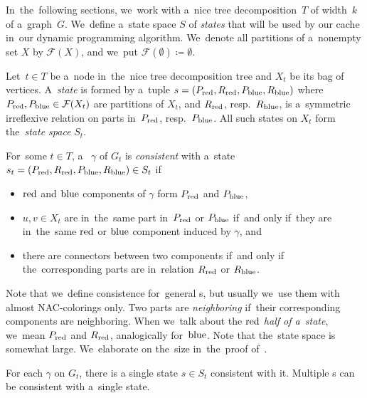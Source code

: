 In~the~following sections,
we~work with a~nice tree decomposition~\( T \) of width~\( k \)
of a~graph~\( G \).
%
We~define a~state space \( S \) of \emph{states}
that will be used by our cache in~our dynamic programming algorithm.
We~denote all partitions of a~nonempty set \( X \) by \( \mathcal{F}(X) \),
and we~put \( \mathcal{F}(\emptyset) \coloneq \emptyset \).

%
\begin{definition}
	Let~\( t \in T \) be a~node in~the~nice tree decomposition tree and
	\( X_t \) be its bag of vertices.
	A~\emph{state} is formed by a~tuple \( s = (P_{\text{red}}, R_{\text{red}}, P_{\text{blue}}, R_{\text{blue}}) \)
	where \( P_{\text{red}}, P_{\text{blue}} \in \mathcal{F}(X_t)\) are partitions of \( X_t \),
	and \( R_{\text{red}}\), resp.\ \(R_{\text{blue}} \), is a~symmetric irreflexive relation
	on parts in~\( P_{\text{red}}\), resp.\ \(P_{\text{blue}} \).
	All such states on \( X_t \) form the~\emph{state space} \( S_t \).
\end{definition}
%
For~some \( t \in T \), a~\rbcol{} \( \gamma \) of \( G_t \)
is \emph{consistent} with a~state \( s_t = (P_{\text{red}}, R_{\text{red}}, P_{\text{blue}}, R_{\text{blue}}) \in S_t \) if
%
\begin{itemize}
	\item \( \text{red} \) and \( \text{blue} \) components of \( \gamma \) form \( P_{\text{red}} \) and \( P_{\text{blue}} \),
	\item \( u, v \in X_t \) are in~the~same part in~\( P_{\text{red}} \) or \( P_{\text{blue}} \)
		if~and only if~they are in~the~same \( \text{red} \) or \( \text{blue} \) component induced by \( \gamma \), and
	\item there are connectors between two components if~and only if
		the~corresponding parts are in~relation \( R_{\text{red}} \) or \( R_{\text{blue}} \).
\end{itemize}
%
Note that we~define consistence for~general \rbcol{}s,
but usually we~use them with almost NAC-colorings only.
%
Two parts are \emph{neighboring} if~their corresponding components are neighboring.
When we~talk about the \emph{\( \text{red} \) half of a~state},
we~mean \( P_{\text{red}} \) and \( R_{\text{red}} \),
analogically for~\( \text{blue} \).
%
Note that the~state space is somewhat large.
We~elaborate on the~size in~the~proof of~.
%
\begin{observation}
	For each \rbcol{} \( \gamma \) on \( G_t \),
	there is a single state \( s \in S_t \) consistent with it.
	Multiple \rbcol{}s can be consistent with a~single state.
\end{observation}
%

